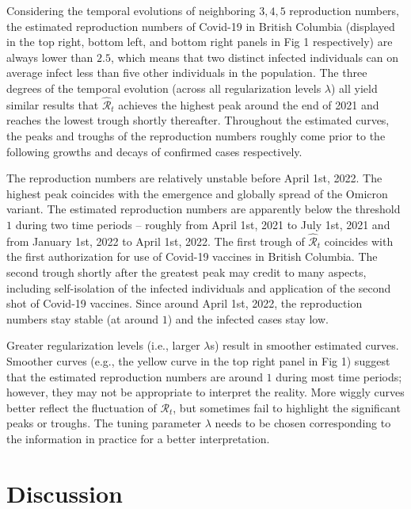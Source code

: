 \documentclass[10pt,letterpaper]{article}
\def\calR{\mathcal{R}}
\begin{document}
Considering the temporal evolutions of neighboring $3, 4, 5$ reproduction numbers, the estimated reproduction numbers of Covid-19 in British Columbia (displayed in the top right, bottom left, and bottom right panels in Fig 1 respectively) are always lower than $2.5$, which means that two distinct infected individuals can on average infect less than five other individuals in the population. The three degrees of the temporal evolution (across all regularization levels $\lambda$) all yield similar results that $\hat{\calR}_t$ achieves the highest peak around the end of 2021 and reaches the lowest trough shortly thereafter. Throughout the estimated curves, the peaks and troughs of the reproduction numbers roughly come prior to the following growths and decays of confirmed cases respectively.

The reproduction numbers are relatively unstable before April 1st, 2022.
The highest peak coincides with the emergence and globally spread of the Omicron variant. The estimated reproduction numbers are apparently below the threshold $1$ during two time periods -- roughly from April 1st, 2021 to July 1st, 2021 and from January 1st, 2022 to April 1st, 2022. The first trough of $\hat{\calR}_t$ coincides with the first authorization for use of Covid-19 vaccines in British Columbia. The second trough shortly after the greatest peak may credit to many aspects, including self-isolation of the infected individuals and application of the second shot of Covid-19 vaccines. 
Since around April 1st, 2022, the reproduction numbers stay stable (at around $1$) and the infected cases stay low. 

Greater regularization levels (i.e., larger $\lambda$s) result in smoother estimated curves. Smoother curves (e.g., the yellow curve in the top right panel in Fig 1) suggest that the estimated reproduction numbers are around $1$ during most time periods; however, they may not be appropriate to interpret the reality. More wiggly curves better reflect the fluctuation of $\calR_t$, but sometimes fail to highlight the significant peaks or troughs. The tuning parameter $\lambda$ needs to be chosen corresponding to the information in practice for a better interpretation.

\section*{Discussion}
\end{document}
